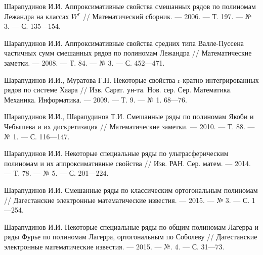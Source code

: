 \begin{thebibliography}{99}
Шарапудинов И.И. Аппроксимативные свойства смешанных рядов по полиномам Лежандра на классах $W^r$ // Математический сборник. --- 2006. --- Т. 197. --- № 3. --- С. 135---154.









Шарапудинов И.И. Аппроксимативные свойства средних типа Валле-Пуссена частичных сумм смешанных рядов по полиномам Лежандра // Математические заметки. --- 2008. --- Т. 84. --- № 3. --- С. 452---471.









Шарапудинов И.И., Муратова Г.Н. Некоторые свойства r-кратно интегрированных рядов по системе Хаара // Изв. Сарат. ун-та. Нов. сер. Сер. Математика. Механика. Информатика. --- 2009. --- Т. 9. --- № 1. 68---76.










Шарапудинов И.И., Шарапудинов Т.И. Смешанные ряды по полиномам Якоби и Чебышева и их дискретизация // Математические заметки. --- 2010. --- Т. 88. --- № 1. --- С. 116---147.










Шарапудинов И.И. Некоторые специальные ряды по ультрасферическим полиномам и их аппроксимативные свойства // Изв. РАН. Сер. матем. --- 2014. --- Т. 78. --- № 5. --- С. 201---224.










Шарапудинов И.И. Смешанные ряды по классическим ортогональным полиномам // Дагестанские электронные математические известия. --- 2015. --- № 3. --- С. 1---254.










Шарапудинов И.И. Некоторые специальные ряды по общим полиномам Лагерра и ряды Фурье по полиномам Лагерра, ортогональным по Соболеву // Дагестанские электронные математические известия. --- 2015. --- №. 4. --- С. 31---73.











\end{thebibliography}
